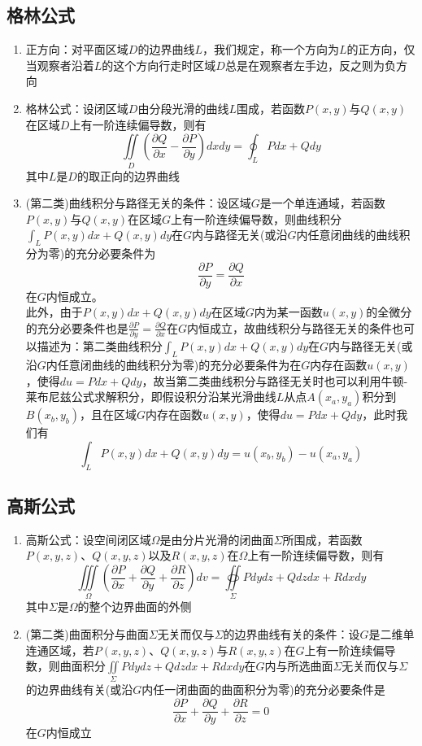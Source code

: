 \documentclass[12pt,a4paper,UTF8]{book}
\begin{document}
\subsection{格林公式}
\begin{enumerate}
\item 正方向：对平面区域$D$的边界曲线$L$，我们规定，称一个方向为$L$的正方向，仅当观察者沿着$L$的这个方向行走时区域$D$总是在观察者左手边，反之则为负方向
\item 格林公式：设闭区域$D$由分段光滑的曲线$L$围成，若函数$P\left(x,y\right)$与$Q\left(x,y\right)$在区域$D$上有一阶连续偏导数，则有
\[\iint\limits_{D}\left(\frac{\partial Q}{\partial x}-\frac{\partial P}{\partial y}\right)dxdy=\oint_{L}Pdx+Qdy\]
其中$L$是$D$的取正向的边界曲线
\item (第二类)曲线积分与路径无关的条件：设区域$G$是一个单连通域，若函数$P\left(x,y\right)$与$Q\left(x,y\right)$在区域$G$上有一阶连续偏导数，则曲线积分$\int_{L}P\left(x,y\right)dx+Q\left(x,y\right)dy$在$G$内与路径无关(或沿$G$内任意闭曲线的曲线积分为零)的充分必要条件为
\[\frac{\partial P}{\partial y}=\frac{\partial Q}{\partial x}\]
在$G$内恒成立。\\
此外，由于$P\left(x,y\right)dx+Q\left(x,y\right)dy$在区域$G$内为某一函数$u\left(x,y\right)$的全微分的充分必要条件也是$\frac{\partial P}{\partial y}=\frac{\partial Q}{\partial x}$在$G$内恒成立，故曲线积分与路径无关的条件也可以描述为：第二类曲线积分$\int_{L}P\left(x,y\right)dx+Q\left(x,y\right)dy$在$G$内与路径无关(或沿$G$内任意闭曲线的曲线积分为零)的充分必要条件为在$G$内存在函数$u\left(x,y\right)$，使得$du=Pdx+Qdy$，故当第二类曲线积分与路径无关时也可以利用牛顿-莱布尼兹公式求解积分，即假设积分沿某光滑曲线$L$从点$A\left(x_a,y_a\right)$积分到$B\left(x_b,y_b\right)$，且在区域$G$内存在函数$u\left(x,y\right)$，使得$du=Pdx+Qdy$，此时我们有
\[\int_{L}P\left(x,y\right)dx+Q\left(x,y\right)dy=u\left(x_b,y_b\right)-u\left(x_a,y_a\right)\]
\end{enumerate}

\subsection{高斯公式}
\begin{enumerate}
\item 高斯公式：设空间闭区域$\Omega$是由分片光滑的闭曲面$\Sigma$所围成，若函数$P\left(x,y,z\right)$、$Q\left(x,y,z\right)$以及$R\left(x,y,z\right)$在$\Omega$上有一阶连续偏导数，则有
\[\iiint\limits_{\Omega}\left(\frac{\partial P}{\partial x}+\frac{\partial Q}{\partial y}+\frac{\partial R}{\partial z}\right)dv=\oiint\limits_{\Sigma}Pdydz+Qdzdx+Rdxdy\]
其中$\Sigma$是$\Omega$的整个边界曲面的外侧
\item (第二类)曲面积分与曲面$\Sigma$无关而仅与$\Sigma$的边界曲线有关的条件：设$G$是二维单连通区域，若$P\left(x,y,z\right)$、$Q\left(x,y,z\right)$与$R\left(x,y,z\right)$在$G$上有一阶连续偏导数，则曲面积分$\iint\limits_{\Sigma}Pdydz+Qdzdx+Rdxdy$在$G$内与所选曲面$\Sigma$无关而仅与$\Sigma$的边界曲线有关(或沿$G$内任一闭曲面的曲面积分为零)的充分必要条件是
\[\frac{\partial P}{\partial x}+\frac{\partial Q}{\partial y}+\frac{\partial R}{\partial z}=0\]
在$G$内恒成立
\end{enumerate}
\end{document}
